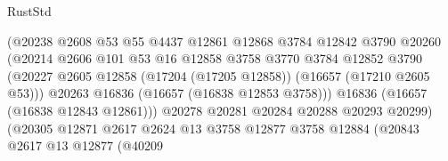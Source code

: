 \begin{lexlean}{RustStd}
\begin{coremodule}
                                        (@20238
                                          @2608
                                          @53
                                          @55
                                          @4437
                                          @12861
                                          @12868
                                          @3784
                                          @12842
                                          @3790
                                          @20260
                                          (@20214
                                            @2606
                                            @101
                                            @53
                                            @16
                                            @12858
                                            @3758
                                            @3770
                                            @3784
                                            @12852
                                            @3790
                                            (@20227
                                              @2605
                                              @12858
                                              (@17204 (@17205 @12858))
                                              (@16657 (@17210 @2605 @53)))
                                            @20263
                                            @16836
                                            (@16657 (@16838 @12853 @3758)))
                                          @16836
                                          (@16657 (@16838 @12843 @12861)))
                                        @20278
                                        @20281
                                        @20284
                                        @20288
                                        @20293
                                        @20299)
                                      (@20305
                                        @12871
                                        @2617
                                        @2624
                                        @13
                                        @3758
                                        @12877
                                        @3758
                                        @12884
                                        (@20843
                                          @2617
                                          @13
                                          @12877
                                          (@40209

\end{coremodule}
\end{lexlean}
